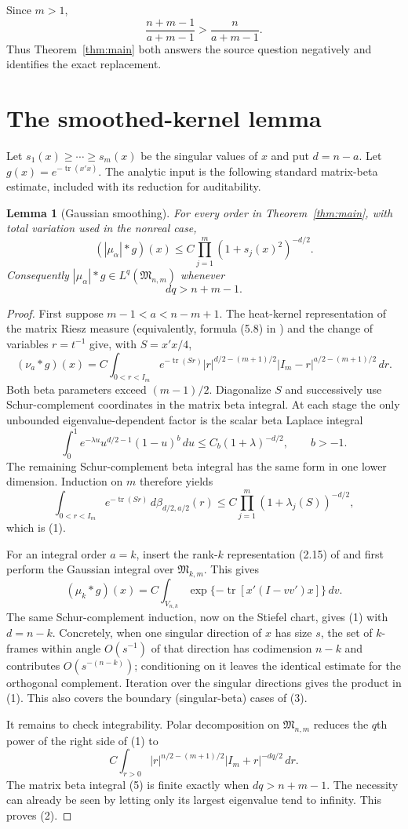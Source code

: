 \documentclass[11pt]{article}
\newtheorem{lemma}{Lemma}
\newcommand{\M}{\mathfrak M}
\newcommand{\tr}{\operatorname{tr}}
\begin{document}
Since $m>1$,
\[
 \frac{n+m-1}{a+m-1}>\frac{n}{a+m-1}.
\]
Thus Theorem~\ref{thm:main} both answers the source question negatively and
identifies the exact replacement.

\section{The smoothed-kernel lemma}

Let $s_1(x)\ge\cdots\ge s_m(x)$ be the singular values of $x$ and put
$d=n-a$.  Let $g(x)=e^{-\tr(x'x)}$.  The analytic input is the following
standard matrix-beta estimate, included with its reduction for auditability.

\begin{lemma}[Gaussian smoothing]\label{lem:smooth}
For every order in Theorem~\ref{thm:main}, with total variation used in the
nonreal case,
\[
 (|\mu_\alpha|*g)(x)
 \le C\prod_{j=1}^m(1+s_j(x)^2)^{-d/2}.
 \tag{1}
\]
Consequently $|\mu_\alpha|*g\in L^q(\M_{n,m})$ whenever
\[
 dq>n+m-1. \tag{2}
\]
\end{lemma}

\begin{proof}
First suppose $m-1<a<n-m+1$.  The heat-kernel representation of the
matrix Riesz measure (equivalently, formula (5.8) in \cite{Rubin}) and the
change of variables $r=t^{-1}$ give, with $S=x'x/4$,
\[
 (\nu_a*g)(x)=C\!\int_{0<r<I_m}
 e^{-\tr(Sr)}|r|^{d/2-(m+1)/2}
 |I_m-r|^{a/2-(m+1)/2}\,dr. \tag{3}
\]
Both beta parameters exceed $(m-1)/2$.  Diagonalize $S$ and successively
use Schur-complement coordinates in the matrix beta integral.  At each
stage the only unbounded eigenvalue-dependent factor is the scalar beta
Laplace integral
\[
 \int_0^1e^{-\lambda u}u^{d/2-1}(1-u)^b\,du
 \le C_b(1+\lambda)^{-d/2},\qquad b>-1.
\]
The remaining Schur-complement beta integral has the same form in one lower
dimension.  Induction on $m$ therefore yields
\[
 \int_{0<r<I_m}e^{-\tr(Sr)}\,d\beta_{d/2,a/2}(r)
 \le C\prod_{j=1}^m(1+\lambda_j(S))^{-d/2},
\]
which is (1).

For an integral order $a=k$, insert the rank-$k$ representation (2.15) of
\cite{OOR} and first perform the Gaussian integral over
$\M_{k,m}$.  This gives
\[
 (\mu_k*g)(x)=C\int_{V_{n,k}}
 \exp\{-\tr[x'(I-vv')x]\}\,dv. \tag{4}
\]
The same Schur-complement induction, now on the Stiefel chart, gives (1)
with $d=n-k$.  Concretely, when one singular direction of $x$ has size
$s$, the set of $k$-frames within angle $O(s^{-1})$ of that direction has
codimension $n-k$ and contributes $O(s^{-(n-k)})$; conditioning on it
leaves the identical estimate for the orthogonal complement.  Iteration
over the singular directions gives the product in (1).  This also covers
the boundary (singular-beta) cases of (3).

It remains to check integrability.  Polar decomposition on $\M_{n,m}$
reduces the $q$th power of the right side of (1) to
\[
 C\int_{r>0}|r|^{n/2-(m+1)/2}
 |I_m+r|^{-dq/2}\,dr. \tag{5}
\]
The matrix beta integral (5) is finite exactly when
$dq>n+m-1$.  The necessity can already be seen by letting only its largest
eigenvalue tend to infinity.  This proves (2).
\end{proof}
\end{document}
